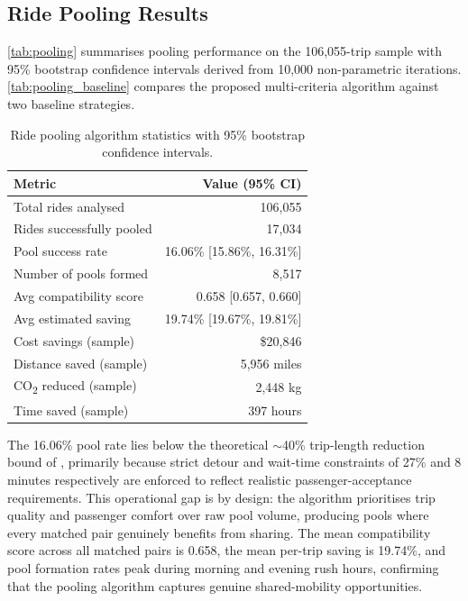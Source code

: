 \documentclass[a4paper,fleqn]{cas-dc}
\begin{document}
\subsection{Ride Pooling Results}

\autoref{tab:pooling} summarises pooling performance on the 106,055-trip sample with 95\% bootstrap confidence intervals derived from 10,000 non-parametric iterations.  \autoref{tab:pooling_baseline} compares the proposed multi-criteria algorithm against two baseline strategies.

\begin{table}[t]
\centering
\caption{Ride pooling algorithm statistics with 95\% bootstrap confidence intervals.\label{tab:pooling}}
\begin{tabularx}{\columnwidth}{>{\raggedright\arraybackslash}X r}
\toprule
\textbf{Metric} & \textbf{Value (95\% CI)} \\
\midrule
Total rides analysed      & 106,055 \\
Rides successfully pooled & 17,034 \\
Pool success rate         & 16.06\% [15.86\%, 16.31\%] \\
Number of pools formed    & 8,517 \\
Avg compatibility score   & 0.658 [0.657, 0.660] \\
Avg estimated saving      & 19.74\% [19.67\%, 19.81\%] \\
Cost savings (sample)     & \$20,846 \\
Distance saved (sample)   & 5,956 miles \\
CO\textsubscript{2} reduced (sample) & 2,448 kg \\
Time saved (sample)       & 397 hours \\
\bottomrule
\end{tabularx}
\end{table}

The 16.06\% pool rate lies below the theoretical $\sim$40\% trip-length reduction bound of \cite{santi2014quantifying}, primarily because strict detour and wait-time constraints of 27\% and 8 minutes respectively are enforced to reflect realistic passenger-acceptance requirements.  This operational gap is by design: the algorithm prioritises trip quality and passenger comfort over raw pool volume, producing pools where every matched pair genuinely benefits from sharing.  The mean compatibility score across all matched pairs is 0.658, the mean per-trip saving is 19.74\%, and pool formation rates peak during morning and evening rush hours, confirming that the pooling algorithm captures genuine shared-mobility opportunities.
\end{document}
